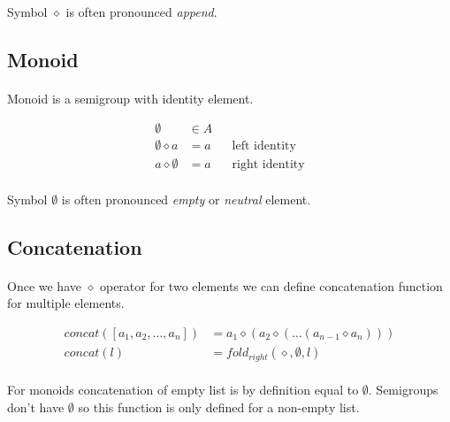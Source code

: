 \documentclass{article}
\begin{document}
    \paragraph{}
    Symbol $\diamond$ is often pronounced \textit{append}.

\subsection{Monoid}

    \paragraph{}
    Monoid is a semigroup with identity element.

    \begin{align*}
        \emptyset &\in A \\
        \emptyset \diamond a &= a && \text{left  identity} \\
        a \diamond \emptyset &= a && \text{right identity} 
    \end{align*}

    \paragraph{}
    Symbol $\emptyset$ is often pronounced \textit{empty} or \textit{neutral} element.

\subsection{Concatenation}

    \paragraph{}
    Once we have $\diamond$ operator for two elements we can define concatenation function for multiple elements.

    \begin{align*}
        concat([a_1, a_2, \dots, a_n]) &= a_1 \diamond (a_2 \diamond (\dots (a_{n-1} \diamond a_n))) \\
        concat(l) &= fold_{right}(\diamond, \emptyset, l)
    \end{align*}

    \paragraph{}
    For monoids concatenation of empty list is by definition equal to $\emptyset$.
    Semigroups don't have $\emptyset$ so this function is only defined for a non-empty list.
\end{document}
